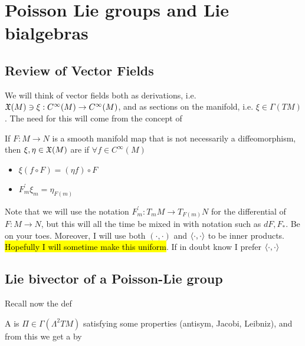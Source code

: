 \documentclass{article}
\begin{document}
\section{Poisson Lie groups and Lie bialgebras}

\subsection{Review of Vector Fields}
We will think of vector fields both as derivations, i.e. $\mathfrak{X}(M) \ni \xi : C^\infty(M) \to C^\infty(M)$, and as sections on the manifold, i.e. $\xi \in \Gamma(TM)$. The need for this will come from the concept of 

\begin{definition}
If $F:M \to N$ is a smooth manifold map that is not necessarily a diffeomorphism, then $\xi,\eta \in \mathfrak{X}(M)$ are  if $\forall f \in C^\infty(M)$
\begin{itemize}
    \item $\xi(f \circ F) = (\eta f) \circ F$
    \item $F^\prime_m \xi_m = \eta_{F(m)}$
\end{itemize}
\end{definition}

\begin{notation}
Note that we will use the notation $F^\prime_m:T_mM \to T_{F(m)}N$ for the differential of $F:M \to N$, but this will all the time be mixed in with notation such as $dF, F_\ast$. Be on your toes. Moreover, I will use both $(\cdot, \cdot)$ and $\left\langle \cdot, \cdot \right\rangle$ to be inner products. \hl{Hopefully I will sometime make this uniform}. If in doubt know I prefer $\left\langle \cdot, \cdot \right\rangle$
\end{notation}

\subsection{Lie bivector of a Poisson-Lie group}

Recall now the def 
\begin{definition}
A  is $\Pi \in \Gamma(\Lambda^2 TM)$ satisfying some properties (antisym, Jacobi, Leibniz), and from this we get a  by 
\end{definition}
\end{document}
